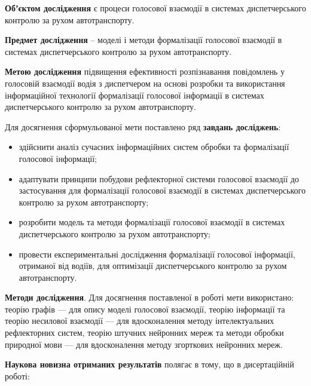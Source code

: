\textbf{Обʼєктом дослідження} є процеси голосової взаємодії в системах диспетчерського контролю за рухом автотранспорту.

\textbf{Предмет дослідження} – моделі і методи формалізації голосової взаємодії в системах диспетчерського контролю за рухом автотранспорту.

\textbf{Метою дослідження} підвищення ефективності розпізнавання повідомлень у голосовій взаємодії водія з диспетчером на основі розробки та використання інформаційної технології формалізації голосової інформації в системах диспетчерського контролю за рухом автотранспорту.

Для досягнення сформульованої мети поставлено ряд \textbf{завдань досліджень}:

\begin{itemize}
	\item здійснити аналіз сучасних інформаційних систем обробки та формалізації голосової інформації;
	\item адаптувати принципи побудови рефлекторної системи голосової взаємодії до застосування для формалізації голосової взаємодії в системах диспетчерського контролю за рухом автотранспорту;
	\item розробити модель та методи формалізації голосової взаємодії в системах диспетчерського контролю за рухом автотранспорту;
	\item провести експериментальні дослідження формалізації голосової інформації, отриманої від водіїв, для оптимізації диспетчерського контролю за рухом автотранспорту.
\end{itemize}

\textbf{Методи дослідження}. Для досягнення поставленої в роботі мети використано: теорію графів --- для опису моделі голосової взаємодії, теорію інформації та теорію несилової взаємодії --- для вдосконалення методу інтелектуальних рефлекторних систем, теорію штучних нейронних мереж та методи обробки природної мови --- для вдосконалення методу згорткових нейронних мереж.

\textbf{Наукова новизна отриманих результатів} полягає в тому, що в дисертаційній роботі:

